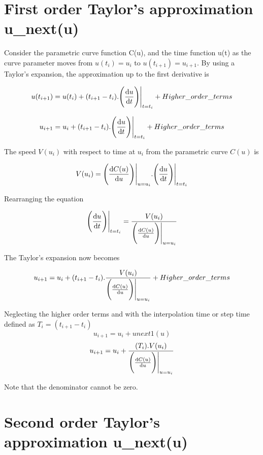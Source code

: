 

\clearpage
\pagebreak

\section{First order Taylor's approximation u\_next(u)}

Consider the parametric curve function C(u), and the time function u(t) as the curve parameter moves from $u(t_{i}) = u_{i}$ to $u(t_{i+1}) = u_{i+1}$. By using a Taylor's expansion, the approximation up to the first derivative is

\[ u(t_{i+1}) = u(t_{i}) + (t_{i+1} - t_{i} ).{\Bigg ( \odv{u}{t} \Bigg ) \Bigg |_{t=t_{i}}} + Higher\_order\_terms \]


\[ u_{i+1} = u_{i} + (t_{i+1} - t_{i} ).{\Bigg ( \odv{u}{t} \Bigg ) \Bigg |_{t=t_{i}}} + Higher\_order\_terms \]

The speed $V(u_{i})$ with respect to time at $u_{i}$ from the parametric curve $C(u)$ is 

\[  V(u_{i}) = \Bigg ( \odv{C(u)}{u} \Bigg ) \Bigg |_{u=u_{i}}. \Bigg ( \odv{u}{t} \Bigg ) \Bigg |_{t=t_{i}} \]

Rearranging the equation 

\[ {\Bigg ( \odv{u}{t} \Bigg ) \Bigg |_{t=t_{i}}} = \frac {V(u_{i})} {\Bigg ( \odv{C(u)}{u} \Bigg ) \Bigg |_{u=u_{i}}} \]

The Taylor's expansion now becomes

\[ u_{i+1} = u_{i} + (t_{i+1} - t_{i} ). \frac {V(u_{i})} {\Bigg ( \odv{C(u)}{u} \Bigg ) \Bigg |_{u=u_{i}}} + Higher\_order\_terms \]
\vspace{0.5cm} 

Neglecting the higher order terms and with the interpolation time or step time defined as $T_{i} = (t_{i+1} - t_{i})$  
\[ u_{i+1} = u_{i} +   unext1(u)\]
\[ u_{i+1} = u_{i} +  \frac {(T_{i}).V(u_{i})} {\Bigg ( \odv{C(u)}{u} \Bigg ) \Bigg |_{u=u_{i}} }\]
\vspace{0.5cm} 

Note that the denominator cannot be zero.

\clearpage
\pagebreak

\section{Second order Taylor's approximation u\_next(u)}

